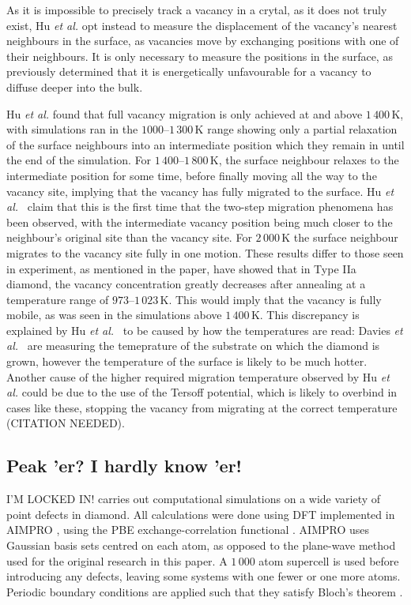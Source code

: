 \documentclass[10pt,a4paper,twocolumn,twoside]{extarticle}
\newcommand{\al}{\emph{et al. }}
\begin{document}
As it is impossible to precisely track a vacancy in a crytal, as it does not truly exist, Hu \al opt instead to measure the displacement of the vacancy's nearest neighbours in the surface, as vacancies move by exchanging positions with one of their neighbours. It is only necessary to measure the positions in the surface, as \textcite{Halicioglu} previously determined that it is energetically unfavourable for a vacancy to diffuse deeper into the bulk. 

Hu \al found that full vacancy migration is only achieved at and above $1\,400$\,K, with simulations ran in the $1000$--$1\,300$\,K range showing only a partial relaxation of the surface neighbours into an intermediate position which they remain in until the end of the simulation. For $1\,400$--$1\,800$\,K, the surface neighbour relaxes to the intermediate position for some time, before finally moving all the way to the vacancy site, implying that the vacancy has fully migrated to the surface. Hu \al~claim that this is the first time that the two-step migration phenomena has been observed, with the intermediate vacancy position being much closer to the neighbour's original site than the vacancy site. For $2\,000$\,K the surface neighbour migrates to the vacancy site fully in one motion. These results differ to those seen in experiment, as mentioned in the paper, \textcite{Davies} have showed that in Type IIa diamond, the vacancy concentration greatly decreases after annealing at a temperature range of $973$--$1\,023$\,K. This would imply that the vacancy is fully mobile, as was seen in the simulations above $1\,400$\,K. This discrepancy is explained by Hu \al~to be caused by how the temperatures are read: Davies \al~are measuring the temeprature of the substrate on which the diamond is grown, however the temperature of the surface is likely to be much hotter. Another cause of the higher required migration temperature observed by Hu \al could be due to the use of the Tersoff potential, which is likely to overbind in cases like these, stopping the vacancy from migrating at the correct temperature (CITATION NEEDED).

\subsection{Peak 'er? I hardly know 'er!} I'M LOCKED IN!
\textcite{Peaker} carries out computational simulations on a wide variety of point defects in diamond. All calculations were done using DFT implemented in AIMPRO \cite{AIMPRO}, using the PBE exchange-correlation functional \cite{PBE}. AIMPRO uses Gaussian basis sets centred on each atom, as opposed to the plane-wave method used for the original research in this paper. A $1\,000$ atom supercell is used before introducing any defects, leaving some systems with one fewer or one more atoms. Periodic boundary conditions are applied such that they satisfy Bloch's theorem \cite{Bloch}. 
\end{document}
